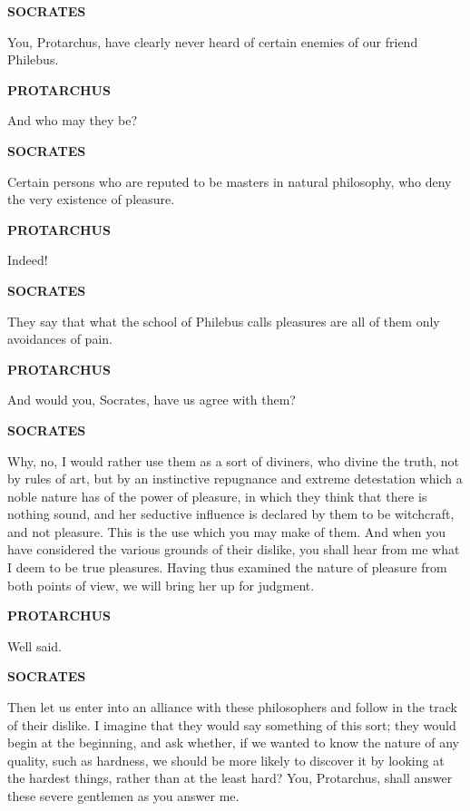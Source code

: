 \documentclass[11pt,letter]{article}
\begin{document}
\par \textbf{SOCRATES}
\par   You, Protarchus, have clearly never heard of certain enemies of our friend Philebus.

\par \textbf{PROTARCHUS}
\par   And who may they be?

\par \textbf{SOCRATES}
\par   Certain persons who are reputed to be masters in natural philosophy, who deny the very existence of pleasure.

\par \textbf{PROTARCHUS}
\par   Indeed!

\par \textbf{SOCRATES}
\par   They say that what the school of Philebus calls pleasures are all of them only avoidances of pain.

\par \textbf{PROTARCHUS}
\par   And would you, Socrates, have us agree with them?

\par \textbf{SOCRATES}
\par   Why, no, I would rather use them as a sort of diviners, who divine the truth, not by rules of art, but by an instinctive repugnance and extreme detestation which a noble nature has of the power of pleasure, in which they think that there is nothing sound, and her seductive influence is declared by them to be witchcraft, and not pleasure. This is the use which you may make of them. And when you have considered the various grounds of their dislike, you shall hear from me what I deem to be true pleasures. Having thus examined the nature of pleasure from both points of view, we will bring her up for judgment.

\par \textbf{PROTARCHUS}
\par   Well said.

\par \textbf{SOCRATES}
\par   Then let us enter into an alliance with these philosophers and follow in the track of their dislike. I imagine that they would say something of this sort; they would begin at the beginning, and ask whether, if we wanted to know the nature of any quality, such as hardness, we should be more likely to discover it by looking at the hardest things, rather than at the least hard? You, Protarchus, shall answer these severe gentlemen as you answer me.
\end{document}
